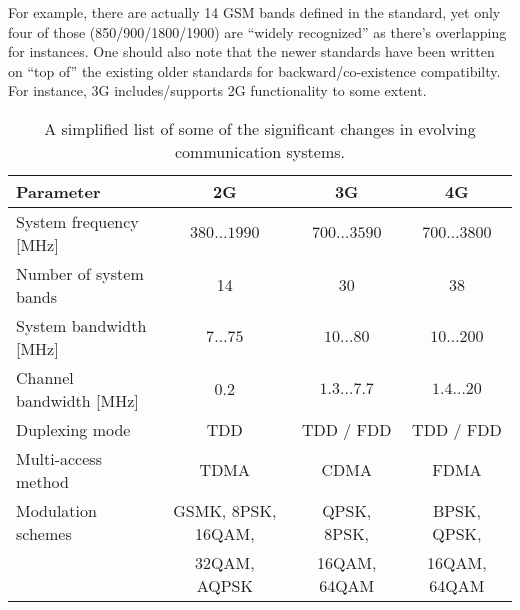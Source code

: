\documentclass[a4paper, 12pt]{article}
\begin{document}
For example, there are actually 14 GSM bands defined in the standard, yet only 
four of those (850/900/1800/1900) are ``widely recognized'' as there's overlapping 
for instances. One should also note that the newer standards have been written 
on ``top of'' the existing older standards for backward/co-existence compatibilty. 
For instance, 3G includes/supports 2G functionality to some extent. 

\begin{table}[!h]
	\begin{center}
	\caption{A simplified list of some of the significant changes in evolving communication systems.}
	\label{t:234g}
	\renewcommand*{\arraystretch}{1.2}
	\begin{tabular}{lccc}
	\textbf{Parameter}							& \textbf{2G} \cite{2g} 					& \textbf{3G} \cite{3g} 				& \textbf{4G} \cite{4g} \\
	\hline
	System frequency [MHz]						& $380 \ldots 1990$							& $700 \ldots 3590$						& $700 \ldots 3800$	 \\
	Number of system bands						& 14										& 30									& 38	 \\
	System bandwidth [MHz]						& $7 \ldots 75$								& $10 \ldots 80$						& $10 \ldots 200$	 \\
	Channel bandwidth [MHz]						& 0.2										& $1.3 \ldots 7.7$							& $1.4 \ldots 20$	 \\
	Duplexing mode								& TDD										& TDD / FDD								& TDD / FDD	 \\
	Multi-access method							& TDMA										& CDMA									& FDMA	 \\
	Modulation schemes							& GSMK, 8PSK, 16QAM,						& QPSK, 8PSK, 							& BPSK, QPSK, 	 \\[-2.4pt]
												& 32QAM, AQPSK								& 16QAM, 64QAM							& 16QAM, 64QAM	 \\
	\end{tabular}
	\end{center}
	\vspace*{-12pt}
\end{table}
\end{document}
